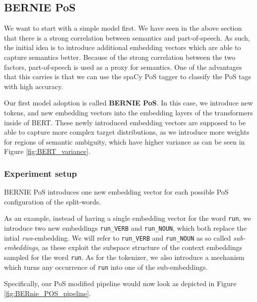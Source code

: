 \documentclass[a4paper,12pt,twoside,openright]{report}
\begin{document}
\subsection{BERNIE PoS} \label{bernie_pos}

We want to start with a simple model first.
We have seen in the above section that there is a strong correlation between semantics and part-of-speech.
As such, the initial idea is to introduce additional embedding vectors which are able to capture semantics better.
Because of the strong correlation between the two factors, part-of-speech is used as a proxy for semantics.
One of the advantages that this carries is that we can use the spaCy PoS tagger \cite{spacyb} to classify the PoS tags with high accuracy.

Our first model adoption is called \textbf{BERNIE PoS}.
In this case, we introduce new tokens, and new embedding vectors into the embedding layers of the transformers inside of BERT.
These newly introduced embedding vectors are supposed to  be able to capture more complex target distributions, as we introduce more weights for regions of semantic ambiguity, which have higher variance as can be seen in Figure \eqref{fig:BERT_variance}.

\subsubsection{Experiment setup}

BERNIE PoS introduces one new embedding vector for each possible PoS configuration of the split-words.

As an example, instead of having a single embedding vector for the word \Verb#run#, we introduce two new embeddings \Verb#run_VERB# and \Verb#run_NOUN#, which both replace the intial \textit{run}-embedding. 
We will refer to \Verb#run_VERB# and \Verb#run_NOUN# as so called \textit{sub-embeddings}, as these exploit the subspace structure of the context embeddings sampled for the word \Verb#run#.
As for the tokenizer, we also introduce a mechanism which turns any occurrence of \Verb#run# into one of the sub-embeddings.

Specifically, our PoS modified pipeline would now look as depicted in Figure \ref{fig:BERnie_POS_pipeline}.
\end{document}
